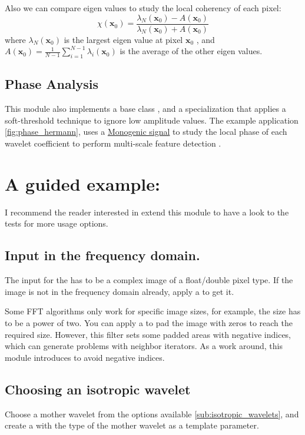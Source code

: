  Also we can compare eigen values to study the local coherency of each pixel:
 $$
 \chi (\mathbf{x}_0)= \frac{\lambda_N(\mathbf{x}_0) - A(\mathbf{x}_0)}{\lambda_N(\mathbf{x}_0) + A(\mathbf{x}_0)}
 $$
where $\lambda_N(\mathbf{x}_0)$ is the largest eigen value at pixel $\mathbf{x}_0$ ,
and
$A(\mathbf{x}_0) = \frac{1}{N-1}\sum_{i=1}^{N-1}\lambda_i(\mathbf{x}_0)$ is the average of the other eigen values.

\subsection{Phase Analysis}
\label{sub:phase_analyzers}

This module also implements a base class , and a specialization  that applies a soft-threshold technique to ignore low amplitude values. The example application \ref{fig:phase_hermann}, uses a \hyperref[sub:monogenic]{Monogenic signal} to study the local phase of each wavelet coefficient to perform multi-scale feature detection \cite{felsberg_monogenic_2001,unser_multiresolution_2009}.

\section{A guided example:}
I recommend the reader interested in extend this module to have a look to the tests for more usage options.
\subsection{Input in the frequency domain.}
The input for the  has to be a complex image of a float/double pixel type. If the image is not in the frequency domain already, apply a  to get it.

Some FFT algorithms only work for specific image sizes, for example, the size has to be a power of two.
You can apply a  to pad the image with zeros to reach the required size. However, this filter sets some padded areas with negative indices, which can generate problems with neighbor iterators.
As a work around, this module introduces  to avoid negative indices.

\subsection{Choosing an isotropic wavelet}
\label{sub:Choosing}
Choose a mother wavelet from the options available \ref{sub:isotropic_wavelets}, and create a
 with the type of the mother wavelet as a template parameter.

